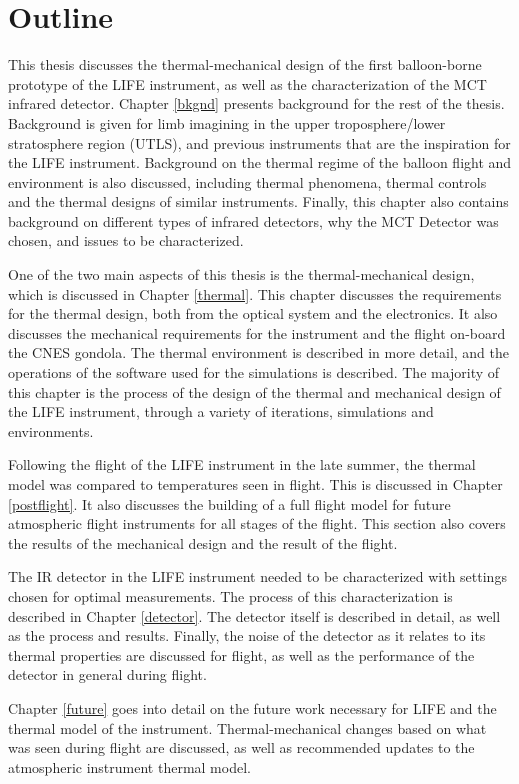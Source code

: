\section{Outline}
This thesis discusses the thermal-mechanical design of the first balloon-borne prototype of the LIFE instrument, as well as the characterization of the MCT infrared detector. Chapter \ref{bkgnd} presents background for the rest of the thesis. Background is given for limb imagining in the upper troposphere/lower stratosphere region (UTLS), and previous instruments that are the inspiration for the LIFE instrument. Background on the thermal regime of the balloon flight and environment is also discussed, including thermal phenomena, thermal controls and the thermal designs of similar instruments. Finally, this chapter also contains background on different types of infrared detectors, why the MCT Detector was chosen, and issues to be characterized.

One of the two main aspects of this thesis is the thermal-mechanical design, which is discussed in Chapter \ref{thermal}. This chapter discusses the requirements for the thermal design, both from the optical system and the electronics. It also discusses the mechanical requirements for the instrument and the flight on-board the CNES gondola. The thermal environment is described in more detail, and the operations of the software used for the simulations is described. The majority of this chapter is the process of the design of the thermal and mechanical design of the LIFE instrument, through a variety of iterations, simulations and environments.

Following the flight of the LIFE instrument in the late summer, the thermal model was compared to temperatures seen in flight. This is discussed in Chapter \ref{postflight}. It also discusses the building of a full flight model for future atmospheric flight instruments for all stages of the flight. This section also covers the results of the mechanical design and the result of the flight.

The IR detector in the LIFE instrument needed to be characterized with settings chosen for optimal measurements. The process of this characterization is described in Chapter \ref{detector}. The detector itself is described in detail, as well as the process and results. Finally, the noise of the detector as it relates to its thermal properties are discussed for flight, as well as the performance of the detector in general during flight.

Chapter \ref{future} goes into detail on the future work necessary for LIFE and the thermal model of the instrument. Thermal-mechanical changes based on what was seen during flight are discussed, as well as recommended updates to the atmospheric instrument thermal model.
